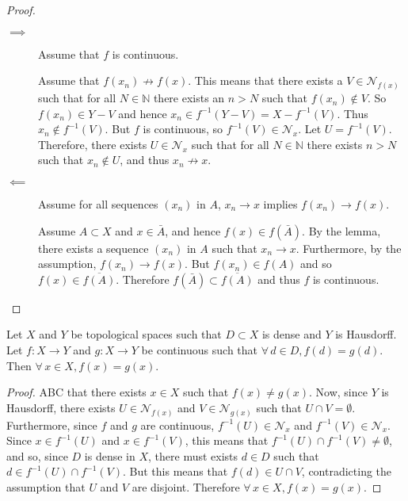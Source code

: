 \documentclass[letterpaper,12pt,fleqn]{article}
\renewcommand{\N}{\mathcal{N}}
\newcommand{\nat}{\mathbb{N}}
\begin{document}
\begin{proof}
  \begin{description}
  \item[]
  \item[\(\implies\)] Assume that \(f\) is continuous.

    Assume that \(f(x_n)\not\to f(x)\).  This means that there exists a \(V\in\N_{f(x)}\) such that for all
    \(N\in\nat\) there exists an \(n>N\) such that \(f(x_n)\notin V\).  So \(f(x_n)\in Y-V\) and hence \(x_n\in
    f^{-1}(Y-V)=X-f^{-1}(V)\).  Thus \(x_n\notin f^{-1}(V)\).  But \(f\) is continuous, so \(f^{-1}(V)\in\N_x\).
    Let \(U=f^{-1}(V)\).  Therefore, there exists \(U\in\N_x\) such that for all \(N\in\nat\) there exists \(n>N\)
    such that \(x_n\notin U\), and thus \(x_n\not\to x\).

  \item[\(\impliedby\)] Assume for all sequences \((x_n)\) in \(A\), \(x_n\to x\) implies \(f(x_n)\to f(x)\).

    Assume \(A\subset X\) and \(x\in\bar{A}\), and hence \(f(x)\in f(\bar{A})\).  By the lemma, there exists a
    sequence \((x_n)\) in \(A\) such that \(x_n\to x\).  Furthermore, by the assumption, \(f(x_n)\to f(x)\).  But
    \(f(x_n)\in f(A)\) and so \(f(x)\in\overline{f(A)}\).  Therefore \(f(\bar{A})\subset\overline{f(A)}\) and thus
    \(f\) is continuous.
  \end{description}
\end{proof}

\begin{theorem}[7.7]
  Let \(X\) and \(Y\) be topological spaces such that \(D\subset X\) is dense and \(Y\) is Hausdorff.  Let
  \(f:X\to Y\) and \(g:X\to Y\) be continuous such that \(\forall\,d\in D,f(d)=g(d)\).  Then
  \(\forall\,x\in X, f(x)=g(x)\).
\end{theorem}

\begin{proof}
  ABC that there exists \(x\in X\) such that \(f(x)\ne g(x)\).  Now, since \(Y\) is Hausdorff, there exists
  \(U\in\N_{f(x)}\) and \(V\in\N_{g(x)}\) such that \(U\cap V=\emptyset\).  Furthermore, since \(f\) and \(g\) are
  continuous, \(f^{-1}(U)\in\N_x\) and \(f^{-1}(V)\in\N_x\).  Since \(x\in f^{-1}(U)\) and \(x\in f^{-1}(V)\), this
  means that \(f^{-1}(U)\cap f^{-1}(V)\ne\emptyset\), and so, since \(D\) is dense in \(X\), there must exists
  \(d\in D\) such that \(d\in f^{-1}(U)\cap f^{-1}(V)\).  But this means that \(f(d)\in U\cap V\), contradicting
  the assumption that \(U\) and \(V\) are disjoint.  Therefore \(\forall\,x\in X,f(x)=g(x)\).
\end{proof}
\end{document}
